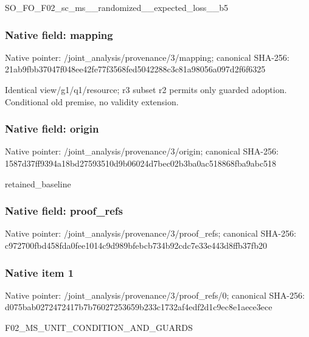 \documentclass[10pt,a4paper]{article}
\begin{document}
\begingroup\raggedright\sloppy SO\_\allowbreak{}FO\_\allowbreak{}F02\_\allowbreak{}sc\_\allowbreak{}ms\_\allowbreak{}\_\allowbreak{}randomized\_\allowbreak{}\_\allowbreak{}expected\_\allowbreak{}loss\_\allowbreak{}\_\allowbreak{}b5\par\endgroup

\subsubsection{Native field: mapping}
Native pointer: /joint\_\allowbreak{}analysis/provenance/3/mapping; canonical SHA-256: 21ab9fbb37047f048ee42fe77f3568fed5042288c3c81a98056a097d2f6f6325

\begingroup\raggedright\sloppy Identical view/\allowbreak{}g1/\allowbreak{}q1/\allowbreak{}resource;\allowbreak{} r3 subset r2 permits only guarded adoption. Conditional old premise,\allowbreak{} no validity extension.\par\endgroup

\subsubsection{Native field: origin}
Native pointer: /joint\_\allowbreak{}analysis/provenance/3/origin; canonical SHA-256: 1587d37ff9394a18bd27593510d9b06024d7bec02b3ba0ac518868fba9abc518

\begingroup\raggedright\sloppy retained\_\allowbreak{}baseline\par\endgroup

\subsubsection{Native field: proof\_\allowbreak{}refs}
Native pointer: /joint\_\allowbreak{}analysis/provenance/3/proof\_\allowbreak{}refs; canonical SHA-256: c972700fbd458fda0fee1014c9d989bfebcb734b92cdc7e33e443d8ffb37fb20

\subsubsection{Native item 1}
Native pointer: /joint\_\allowbreak{}analysis/provenance/3/proof\_\allowbreak{}refs/0; canonical SHA-256: d075bab0272472417b7b76027253659b233c1732af4edf2d1c9ec8e1aece3ece

\begingroup\raggedright\sloppy F02\_\allowbreak{}MS\_\allowbreak{}UNIT\_\allowbreak{}CONDITION\_\allowbreak{}AND\_\allowbreak{}GUARDS\par\endgroup
\end{document}
